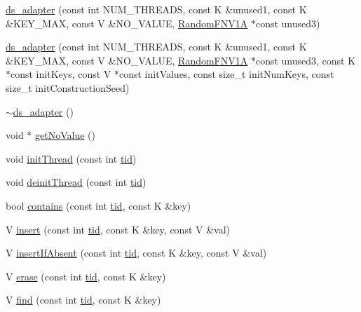 \begin{DoxyCompactItemize}
\hyperlink{classds__adapter_aa3d05821af0b337e15dd4756125bc7af}{ds\+\_\+adapter} (const int N\+U\+M\+\_\+\+T\+H\+R\+E\+A\+DS, const K \&unused1, const K \&K\+E\+Y\+\_\+\+M\+AX, const V \&N\+O\+\_\+\+V\+A\+L\+UE, \hyperlink{classRandomFNV1A}{Random\+F\+N\+V1A} $\ast$const unused3)
\item 
\hyperlink{classds__adapter_a975d60baff60ec11ddb54121b689e86e}{ds\+\_\+adapter} (const int N\+U\+M\+\_\+\+T\+H\+R\+E\+A\+DS, const K \&unused1, const K \&K\+E\+Y\+\_\+\+M\+AX, const V \&N\+O\+\_\+\+V\+A\+L\+UE, \hyperlink{classRandomFNV1A}{Random\+F\+N\+V1A} $\ast$const unused3, const K $\ast$const init\+Keys, const V $\ast$const init\+Values, const size\+\_\+t init\+Num\+Keys, const size\+\_\+t init\+Construction\+Seed)
\item 
\hyperlink{classds__adapter_a366f46dd39d59f2d4a147589f5fd98e3}{$\sim$ds\+\_\+adapter} ()
\item 
void $\ast$ \hyperlink{classds__adapter_adb631e454b8146520f601d1a86c6c72c}{get\+No\+Value} ()
\item 
void \hyperlink{classds__adapter_a3733f6a6b57312b1b5e4fb5181d82a0b}{init\+Thread} (const int \hyperlink{microbench_2main_8cpp_a9ca9869868fe7e7a38a921cc7de4103f}{tid})
\item 
void \hyperlink{classds__adapter_a173ca48b19fc1dc346159ea582c690cd}{deinit\+Thread} (const int \hyperlink{microbench_2main_8cpp_a9ca9869868fe7e7a38a921cc7de4103f}{tid})
\item 
bool \hyperlink{classds__adapter_aecf1899dbe9fae93c72ee2b5549cf6eb}{contains} (const int \hyperlink{microbench_2main_8cpp_a9ca9869868fe7e7a38a921cc7de4103f}{tid}, const K \&key)
\item 
V \hyperlink{classds__adapter_a6c0fc676d77e30e14946baf325174739}{insert} (const int \hyperlink{microbench_2main_8cpp_a9ca9869868fe7e7a38a921cc7de4103f}{tid}, const K \&key, const V \&val)
\item 
V \hyperlink{classds__adapter_ae9cb29ad0c0338c0e1d12ef97e008135}{insert\+If\+Absent} (const int \hyperlink{microbench_2main_8cpp_a9ca9869868fe7e7a38a921cc7de4103f}{tid}, const K \&key, const V \&val)
\item 
V \hyperlink{classds__adapter_a1bf459e8449df93cc738a644aeffdcfb}{erase} (const int \hyperlink{microbench_2main_8cpp_a9ca9869868fe7e7a38a921cc7de4103f}{tid}, const K \&key)
\item 
V \hyperlink{classds__adapter_a0109b0d011810f687c9e9273eb1d1bc8}{find} (const int \hyperlink{microbench_2main_8cpp_a9ca9869868fe7e7a38a921cc7de4103f}{tid}, const K \&key)

\end{DoxyCompactItemize}
